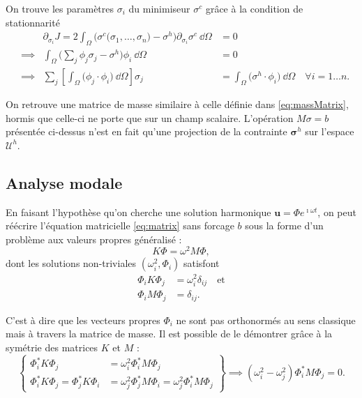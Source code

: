 \documentclass[12pt]{article}
\newcommand{\uu}{\mathbf{u}}
\newcommand{\stress}{\boldsymbol{\sigma}}
\begin{document}
On trouve les paramètres $\sigma_i$ du minimiseur $\sigma^c$ grâce à la 
condition de stationnarité
\begin{equation}
    \begin{alignedat}{2}
        &&\partial_{\sigma_i} J =
        2\int_{\Omega} \Big(
            \sigma^c\big(\sigma_1,\dots, \sigma_n\big) - \sigma^h
            \Big) \partial_{\sigma_i} \sigma^c \:\dd \Omega &= 0\\
        &\implies& \int_{\Omega} \Big(\sum_j \phi_j \sigma_j - \sigma^h\Big) \phi_i \:\dd \Omega &= 0\\
        &\implies& \sum_j \left[\int_{\Omega} \big(\phi_j \cdot \phi_i \big) \:\dd \Omega \right] \sigma_j &=
        \int_{\Omega} \big(\sigma^h \cdot \phi_i\big) \:\dd \Omega \quad \forall i=1\dots n.
    \end{alignedat}
\end{equation}

On retrouve
une matrice de masse similaire à celle définie dans \eqref{eq:massMatrix}, 
hormis que celle-ci ne porte que sur un champ scalaire. 
L'opération $M \sigma = b$ présentée ci-dessus n'est en fait qu'une
projection de la contrainte $\stress^h$ sur l'espace $\mathcal{U}^h$.

\subsection{Analyse modale}
En faisant l'hypothèse qu'on cherche une solution harmonique 
$\uu = \Phi e^{\imath \omega t}$, on peut réécrire l'équation matricielle
\eqref{eq:matrix} sans forcage $b$ sous la forme d'un problème aux valeurs
propres généralisé :
\begin{equation}
    K \Phi = \omega^2 M \Phi, \label{eq:eigenproblem}
\end{equation}
dont les solutions non-triviales $(\omega_i^2, \Phi_i)$ satisfont
\begin{align}
    \Phi_i K \Phi_j &= \omega_i^2 \delta_{ij} \quad\text{et}\\
    \Phi_i M \Phi_j &= \delta_{ij}.
\end{align}

C'est à dire que les vecteurs propres $\Phi_i$ ne sont pas orthonormés au sens
classique mais à travers la matrice de masse. Il est possible de le démontrer
grâce à la symétrie des matrices $K$ et $M$ :
\begin{equation}
    \left\{
        \begin{aligned}    
            \Phi_i^* K \Phi_j &= \omega_i^2 \Phi_i^* M \Phi_j\\
            \Phi_i^* K \Phi_j = \Phi_j^* K \Phi_i &= \omega_j^2 \Phi_j^* M \Phi_i = \omega_j^2 \Phi_i^* M \Phi_j
        \end{aligned}
    \right\} \implies
    (\omega_i^2 - \omega_j^2) \Phi_i^* M \Phi_j = 0.
\end{equation}
\end{document}
